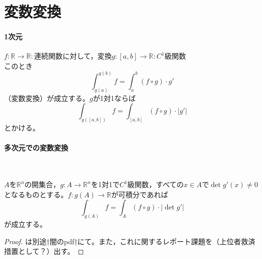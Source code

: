 \section{変数変換}
\paragraph{1次元}
$f:\mathbb{R}\to\mathbb{R}:$連続関数に対して，変換$g:[a,b]\to\mathbb{R}:C^1$級関数\\
このとき
\[
	\int_{g(a)}^{g(b)}f = \int_a^b(f\circ g)\cdot g'
\]
（変数変換）が成立する。$g$が1対1ならば
\[
	\int_{g([a,b])}f=\int_{[a,b]}(f\circ g)\cdot|g'|
\]
とかける。

\paragraph{多次元での変数変換}\

\begin{framed}
	\begin{thm} \label{th3.11}
		$A$を$\mathbb{R}^n$の開集合，$g:A\to\mathbb{R}^n$を1対1で$C^1$級関数，すべての$x\in A$で$\det g'(x)\neq 0$となるものとする。$f:g(A)\to\mathbb{R}$が可積分であれば
		\[
			\int_{g(A)}f=\int_A(f\circ g)\cdot|\det g'|
		\]
		が成立する。
	\end{thm}
\end{framed}

\begin{proof}
	は別途†闇のpdf†にて。また，これに関するレポート課題を（上位者救済措置として？）出す。
\end{proof}


